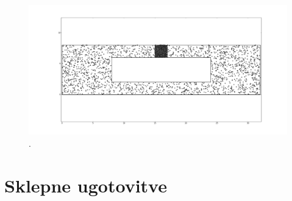 \documentclass[a4paper, 12pt]{book}
\begin{document}
\begin{figure}
\centerline{\includegraphics[scale=0.3]{pics/32-1-5000-stuffed.png}}
\caption{. }
\label{sep-stuffed}
\end{figure}

\chapter{Sklepne ugotovitve}
\label{ch4}




\end{document}
